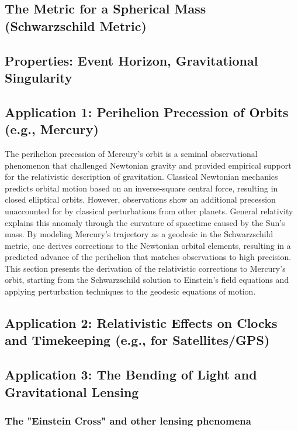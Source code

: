 \documentclass{amsart}
\theoremstyle{definition}
\theoremstyle{remark}
\begin{document}
\subsection{The Metric for a Spherical Mass (Schwarzschild Metric)}

\subsection{Properties: Event Horizon, Gravitational Singularity}

\subsection{Application 1: Perihelion Precession of Orbits (e.g., Mercury)}
\label{subsec:mercury_precession}
The perihelion precession of Mercury’s orbit is a seminal observational phenomenon that challenged Newtonian gravity and provided empirical support for the relativistic description of gravitation. Classical Newtonian mechanics predicts orbital motion based on an inverse-square central force, resulting in closed elliptical orbits. However, observations show an additional precession unaccounted for by classical perturbations from other planets. General relativity explains this anomaly through the curvature of spacetime caused by the Sun’s mass. By modeling Mercury’s trajectory as a geodesic in the Schwarzschild metric, one derives corrections to the Newtonian orbital elements, resulting in a predicted advance of the perihelion that matches observations to high precision. This section presents the derivation of the relativistic corrections to Mercury’s orbit, starting from the Schwarzschild solution to Einstein’s field equations and applying perturbation techniques to the geodesic equations of motion.

\subsection{Application 2: Relativistic Effects on Clocks and Timekeeping (e.g., for Satellites/GPS)}

\subsection{Application 3: The Bending of Light and Gravitational Lensing}
\subsubsection{The "Einstein Cross" and other lensing phenomena}
\end{document}
